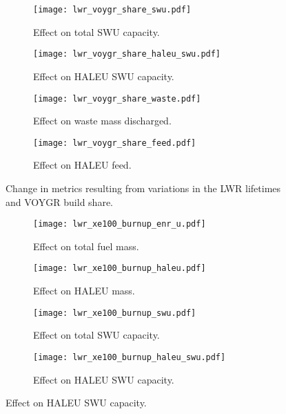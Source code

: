 \begin{figure}   
    \begin{subfigure}[t]{0.48\textwidth}
        \centering
        \texttt{[image: lwr\_voygr\_share\_swu.pdf]}
        \caption{Effect on total SWU capacity.}
        \label{fig:lwr_voygr_share_swu}
    \end{subfigure}
    \hfill
    \begin{subfigure}[t]{0.48\textwidth}
        \centering
        \texttt{[image: lwr\_voygr\_share\_haleu\_swu.pdf]}
        \caption{Effect on HALEU SWU capacity.}
        \label{fig:lwr_voygr_share_haleu_swu}
    \end{subfigure}   
    \begin{subfigure}[t]{0.48\textwidth}
        \centering
        \texttt{[image: lwr\_voygr\_share\_waste.pdf]}
        \caption{Effect on waste mass discharged.}
        \label{fig:lwr_voygr_share_waste}
    \end{subfigure}
    \hfill
    \begin{subfigure}[t]{0.48\textwidth}
        \centering
        \texttt{[image: lwr\_voygr\_share\_feed.pdf]}
        \caption{Effect on HALEU feed.}
        \label{fig:lwr_voygr_share_feed}
    \end{subfigure}
    \caption{Change in metrics resulting from variations in the 
    LWR lifetimes and VOYGR build share.}
    \label{fig:lwr_voygr_share}
\end{figure}

\begin{figure}
    \begin{subfigure}[t]{0.48\textwidth}
        \centering
        \texttt{[image: lwr\_xe100\_burnup\_enr\_u.pdf]}
        \caption{Effect on total fuel mass.}
        \label{fig:lwr_xe100_burnup_enr_u}
    \end{subfigure}
    \hfill
    \begin{subfigure}[t]{0.48\textwidth}
        \centering
        \texttt{[image: lwr\_xe100\_burnup\_haleu.pdf]}
        \caption{Effect on HALEU mass.}
        \label{fig:lwr_xe100_burnup_haleu}
    \end{subfigure}
    
    \begin{subfigure}[t]{0.48\textwidth}
        \centering
        \texttt{[image: lwr\_xe100\_burnup\_swu.pdf]}
        \caption{Effect on total SWU capacity.}
        \label{fig:lwr_xe100_burnup_swu}
    \end{subfigure}
    \hfill
    \begin{subfigure}[t]{0.48\textwidth}
        \centering
        \texttt{[image: lwr\_xe100\_burnup\_haleu\_swu.pdf]}
        \caption{Effect on HALEU SWU capacity.}
        \label{fig:lwr_xe100_burnup_haleu_swu}
    \end{subfigure}
\end{figure}

